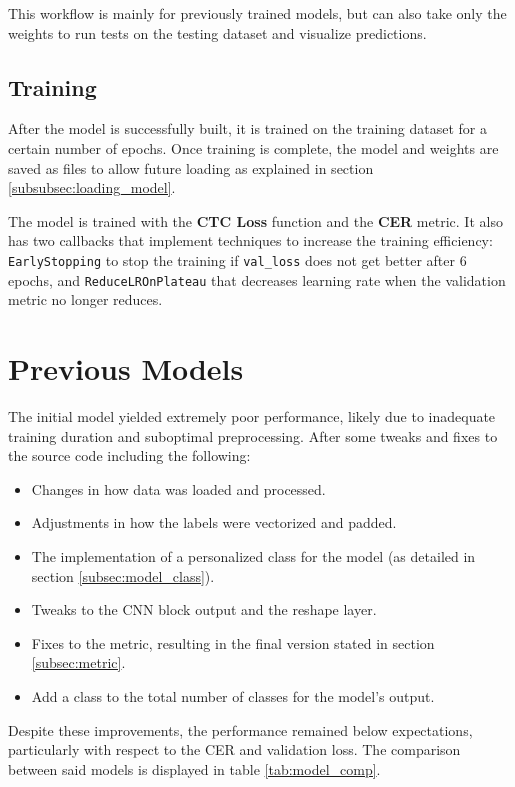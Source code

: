 \documentclass[11pt,letterpaper]{article}
\begin{document}
	This workflow is mainly for previously trained models, but can also take only the weights to run tests on the testing dataset and visualize predictions.
	
	\subsection{Training}
	After the model is successfully built, it is trained on the training dataset for a certain number of epochs. Once training is complete, the model and weights are saved as files to allow future loading as explained in section \ref{subsubsec:loading_model}.
	
	The model is trained with the \textbf{CTC Loss} function and the \textbf{CER} metric. It also has two callbacks that implement techniques to increase the training efficiency: \texttt{EarlyStopping} to stop the training if \texttt{val\_loss} does not get better after 6 epochs, and \texttt{ReduceLROnPlateau} that decreases learning rate when the validation metric no longer reduces.
	
	\section{Previous Models}
	The initial model yielded extremely poor performance, likely due to inadequate training duration and suboptimal preprocessing. After some tweaks and fixes to the source code including the following:
	\begin{itemize}
		\item Changes in how data was loaded and processed.
		\item Adjustments in how the labels were vectorized and padded.
		\item The implementation of a personalized class for the model (as detailed in section \ref{subsec:model_class}).
		\item Tweaks to the CNN block output and the reshape layer.
		\item Fixes to the metric, resulting in the final version stated in section \ref{subsec:metric}.
		\item Add a class to the total number of classes for the model's output.
	\end{itemize}
	
	Despite these improvements, the performance remained below expectations, particularly with respect to the CER and validation loss. The comparison between said models is displayed in table \ref{tab:model_comp}.
	
\end{document}
